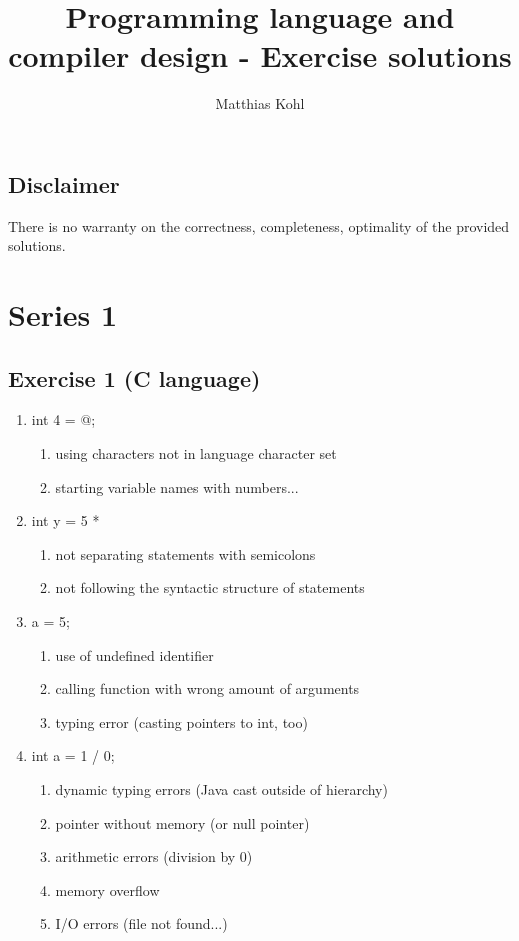\documentclass[12pt,fleqn]{article}		%
\begin{document}
\author{Matthias Kohl}
\title{Programming language and compiler design - Exercise solutions}
\maketitle

\begin{center}
\section*{Disclaimer}
There is no warranty on the correctness, completeness, optimality of the provided solutions.
\end{center}


\section{Series 1}
\subsection{Exercise 1 (C language)}
\begin{enumerate}
\item int 4 = @;
\begin{enumerate}
\item using characters not in language character set
\item starting variable names with numbers...
\end{enumerate}
\item  int y = 5 *
\begin{enumerate}
\item not separating statements with semicolons
\item not following the syntactic structure of statements
\end{enumerate}
\item a = 5;
\begin{enumerate}
\item use of undefined identifier
\item calling function with wrong amount of arguments
\item typing error (casting pointers to int, too)
\end{enumerate}
\item int a = 1 / 0;
\begin{enumerate}
\item dynamic typing errors (Java cast outside of hierarchy)
\item pointer without memory (or null pointer)
\item arithmetic errors (division by 0)
\item memory overflow
\item I/O errors (file not found...)
\end{enumerate}
\end{enumerate}
\end{document}
